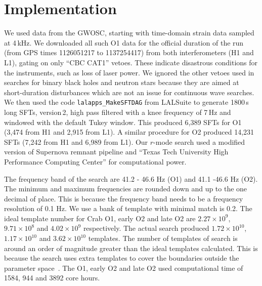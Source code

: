 \documentclass{ttuthes2007}
\begin{document}
\section{Implementation} 
We used data from the \ac{GWOSC}, starting with time-domain strain data sampled
at 4\,kHz.  We downloaded all such \ac{O1} data for the official duration of the
run (from GPS times 1126051217 to 1137254417) from both interferometers (H1 and
L1), gating on only ``CBC CAT1'' vetoes.  These indicate disastrous conditions
for the instruments, such as loss of laser power.  We ignored the other vetoes
used in searches for binary black holes and neutron stars because they are aimed
at short-duration disturbances which are not an issue for continuous wave
searches.  We then used the code \texttt{lalapps\_MakeSFTDAG} from LALSuite to
generate 1800\,s long \acp{SFT}, version\,2, high pass filtered with a knee
frequency of 7\,Hz and windowed with the default Tukey window.  This produced
6,389 \acp{SFT} for \ac{O1} (3,474 from H1 and 2,915 from L1).  A similar
procedure for \ac{O2} produced 14,231 \acp{SFT} (7,242 from H1 and 6,989 from
L1).  Our $r$-mode search used a modified version of Supernova remnant
pipeline\cite{Aasi_2015} and ``Texas Tech University High Performance Computing
Center'' for computational power.

The frequency band of the search are 41.2 - 46.6 Hz (O1) and 41.1 -46.6 Hz (O2).
The minimum and maximum frequencies are rounded down and up to the one decimal
of place. This is because the frequency band needs to be a frequency resolution
of 0.1 Hz. We use a bank of template with minimal match is 0.2. The ideal
template number for Crab O1, early O2 and late O2 are $2.27\times 10^9$,
$9.71\times 10^8$ and $4.02\times 10^9$ respectively. The actual search produced
$1.72\times 10^{10}$, $1.17\times 10^{10}$ and $3.62 \times 10^{10}$ templates.
The number of templates of search is around an order of magnitude greater than
the ideal templates calculated. This is because the search uses extra templates
to cover the boundaries outside the parameter space~\cite{Abadie_2010}. The
O1, early O2 and late O2 used computational time of 1584, 944 and 3892 core
hours. 

\end{document}
